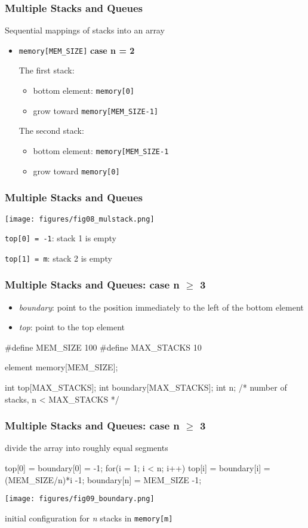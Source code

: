 \documentclass[newPxFont,sthlmFooter,nooffset]{beamer}
\begin{document}
\begin{frame}[t]
  \frametitle{Multiple Stacks and Queues}
Sequential mappings of stacks into an array
\begin{itemize}
\item \texttt{memory[MEM\_SIZE]}
\bigskip
\textbf{case n = 2}

The first stack:
\begin{itemize}
\item bottom element: \texttt{memory[0]}
\item grow toward \texttt{memory[MEM\_SIZE-1]}
\end{itemize}

The second stack:
\begin{itemize}
\item bottom element: \texttt{memory[MEM\_SIZE-1}
\item grow toward \texttt{memory[0]}
\end{itemize}
\end{itemize}

\end{frame}

\begin{frame}[t]
  \frametitle{Multiple Stacks and Queues}
  \begin{center}
    \texttt{[image: figures/fig08\_mulstack.png]}
  \end{center}

\texttt{top[0] = -1}: stack 1 is empty

\texttt{top[1] = m}: stack 2 is empty
\end{frame}

\begin{frame}[t, fragile]
  \frametitle{Multiple Stacks and Queues: case n $\geq$ 3}
\begin{itemize}
\item \textit{boundary}: point to the position immediately to the left of the bottom element
\item \textit{top}: point to the top element
\end{itemize}
\begin{ncodedef}
#define MEM_SIZE 100
#define MAX_STACKS 10

element memory[MEM_SIZE];

int top[MAX_STACKS];
int boundary[MAX_STACKS];
int n; /* number of stacks, n < MAX_STACKS */
\end{ncodedef}
\end{frame}

\begin{frame}[t, fragile]
  \frametitle{Multiple Stacks and Queues: case n $\geq$ 3}
divide the array into roughly equal segments
\begin{ncodedef}
top[0] = boundary[0] = -1;
for(i = 1; i < n; i++)
    top[i] = boundary[i] = (MEM_SIZE/n)*i -1;
boundary[n] = MEM_SIZE -1;
\end{ncodedef}

  \begin{center}
    \texttt{[image: figures/fig09\_boundary.png]}
  \end{center}
initial configuration for \textit{n} stacks in \texttt{memory[m]}
\end{frame}
\end{document}
